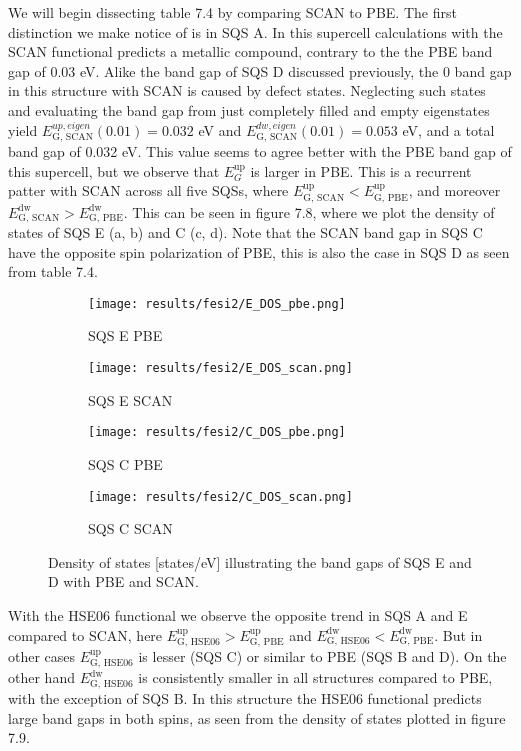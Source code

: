 We will begin dissecting table 7.4 by comparing SCAN to PBE. The first distinction we make notice of is in SQS A. In this supercell calculations with the SCAN functional predicts a metallic compound, contrary to the the PBE band gap of 0.03 eV. Alike the band gap of SQS D discussed previously, the 0 band gap in this structure with SCAN is caused by defect states. Neglecting such states and evaluating the band gap from just completely filled and empty eigenstates yield $E_\text{G, SCAN} ^{up, eigen}(0.01) = 0.032$ eV and $E_\text{G, SCAN} ^{dw, eigen}(0.01) = 0.053$ eV, and a total band gap of 0.032 eV. This value seems to agree better with the PBE band gap of this supercell, but we observe that $E_G ^\text{up}$ is larger in PBE.  This is a recurrent patter with SCAN across all five SQSs, where $E_\text{G, SCAN} ^\text{up} < E_\text{G, PBE} ^\text{up}$, and moreover $E_\text{G, SCAN} ^\text{dw} > E_\text{G, PBE} ^\text{dw}$. This can be seen in figure 7.8, where we plot the density of states of SQS E (a, b) and C (c, d). Note that the SCAN band gap in SQS C have the opposite spin polarization of PBE, this is also the case in SQS D as seen from table 7.4.
\begin{figure}[H]
	\begin{subfigure}{.5\textwidth}
		\texttt{[image: results/fesi2/E\_DOS\_pbe.png]}
		\caption{SQS E PBE}
	\end{subfigure}
	\begin{subfigure}{.5\textwidth}
		\texttt{[image: results/fesi2/E\_DOS\_scan.png]}
		\caption{SQS E SCAN}
	\end{subfigure}
	\begin{subfigure}{.5\textwidth}
		\texttt{[image: results/fesi2/C\_DOS\_pbe.png]}
		\caption{SQS C PBE}
	\end{subfigure}
	\begin{subfigure}{.5\textwidth}
		\texttt{[image: results/fesi2/C\_DOS\_scan.png]}
		\caption{SQS C SCAN}
	\end{subfigure}
	\caption{Density of states [states/eV] illustrating the band gaps of SQS E and D with PBE and SCAN.}
\end{figure}

With the HSE06 functional we observe the opposite trend in SQS A and E compared to SCAN, here $E_\text{G, HSE06} ^\text{up} > E_\text{G, PBE} ^\text{up}$ and $E_\text{G, HSE06} ^\text{dw} < E_\text{G, PBE} ^\text{dw}$. But in other cases $E_\text{G, HSE06} ^\text{up}$ is lesser (SQS C) or similar to PBE (SQS B and D). On the other hand $E_\text{G, HSE06} ^\text{dw}$ is consistently smaller in all structures compared to PBE, with the exception of SQS B. In this structure the HSE06 functional predicts large band gaps in both spins, as seen from the density of states plotted in figure 7.9.    
 
